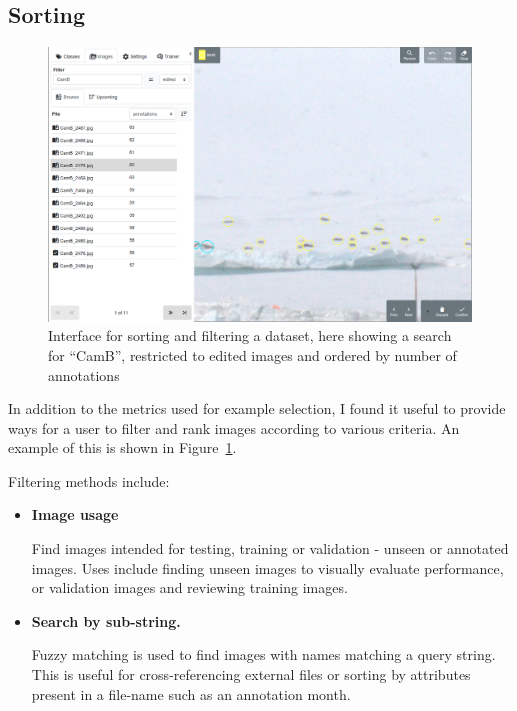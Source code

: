 \subsection {Sorting}

\begin{figure}[!htb]
  \centering
  \includegraphics[width=1.0\linewidth]{figures/annotation/screenshots/sort_filter.png}
  \caption{Interface for sorting and filtering a dataset, here showing a search for ``CamB'', restricted to edited images and ordered by number of annotations}  
  \label{fig:sorting_filtering}
\end{figure}

In addition to the metrics used for example selection, I found it useful to provide ways for a user to filter and rank images according to various criteria. An example of this is shown in Figure~\ref{fig:sorting_filtering}.

Filtering methods include:

\begin{itemize}
    \item {\bf Image usage } \par
Find images intended for testing, training or validation - unseen or annotated images. Uses include finding unseen images to visually evaluate performance, or validation images and reviewing training images.

\item {\bf Search by sub-string.} \par

Fuzzy matching is used to find images with names matching a query string. This is useful for cross-referencing external files or sorting by attributes present in a file-name such as an annotation month.

\end{itemize}

